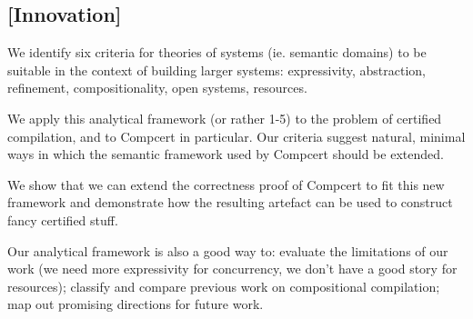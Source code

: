 \documentclass[sigplan,10pt,review,anonymous]{acmart}
\begin{document}
\subsection{[Innovation]}

We identify six criteria for theories of systems (ie. semantic domains)
to be suitable in the context of building larger systems:
expressivity, abstraction, refinement,
compositionality, open systems, resources.

We apply this analytical framework (or rather 1-5)
to the problem of certified compilation,
and to Compcert in particular.
Our criteria suggest natural,
minimal ways in which the semantic framework
used by Compcert should be extended.

We show that we can extend the correctness proof of Compcert
to fit this new framework and
demonstrate how the resulting artefact
can be used to construct fancy certified stuff.

Our analytical framework is also a good way to:
evaluate the limitations of our work
(we need more expressivity for concurrency,
we don't have a good story for resources);
classify and compare previous work on compositional compilation;
map out promising directions for future work.
\end{document}
